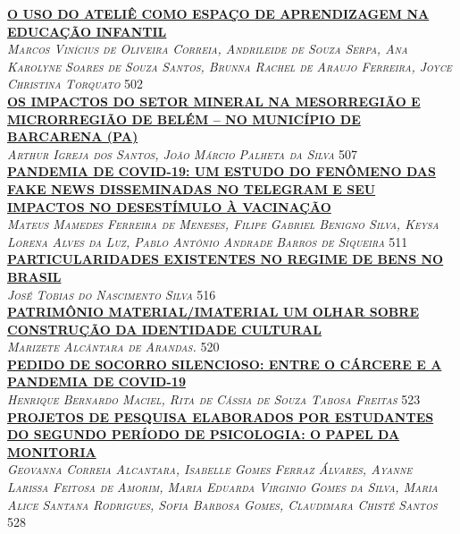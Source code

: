 \noindent \textsc{\hyperlink{trabalhos/251723.pdf.1}{\textbf{O USO DO ATELIÊ COMO ESPAÇO DE APRENDIZAGEM NA EDUCAÇÃO INFANTIL}}}\\ 
\noindent \textsc{\textit{Marcos Vinícius de Oliveira Correia, Andrileide de Souza Serpa, Ana Karolyne Soares de Souza Santos, Brunna Rachel de Araujo Ferreira, Joyce Christina Torquato}} \hfill 502\\ 

\noindent \textsc{\hyperlink{trabalhos/247992.pdf.1}{\textbf{OS IMPACTOS DO SETOR MINERAL NA MESORREGIÃO E MICRORREGIÃO DE BELÉM – NO MUNICÍPIO DE BARCARENA (PA)  }}}\\ 
\noindent \textsc{\textit{Arthur Igreja dos Santos, João Márcio Palheta da Silva}} \hfill 507\\ 

\noindent \textsc{\hyperlink{trabalhos/250093.pdf.1}{\textbf{PANDEMIA DE COVID-19: UM ESTUDO DO FENÔMENO DAS FAKE NEWS DISSEMINADAS NO TELEGRAM E SEU IMPACTOS NO DESESTÍMULO À VACINAÇÃO}}}\\ 
\noindent \textsc{\textit{Mateus Mamedes Ferreira de Meneses, Filipe Gabriel Benigno Silva, Keysa Lorena Alves da Luz, Pablo Antônio Andrade Barros de Siqueira}} \hfill 511\\ 

\noindent \textsc{\hyperlink{trabalhos/242542.pdf.1}{\textbf{PARTICULARIDADES EXISTENTES NO REGIME DE BENS NO BRASIL}}}\\ 
\noindent \textsc{\textit{José Tobias do Nascimento Silva}} \hfill 516\\ 

\noindent \textsc{\hyperlink{trabalhos/250219.pdf.1}{\textbf{PATRIMÔNIO MATERIAL/IMATERIAL UM OLHAR SOBRE CONSTRUÇÃO DA IDENTIDADE CULTURAL}}}\\ 
\noindent \textsc{\textit{Marizete Alcântara de Arandas.}} \hfill 520\\ 

\noindent \textsc{\hyperlink{trabalhos/250281.pdf.1}{\textbf{PEDIDO DE SOCORRO SILENCIOSO: ENTRE O CÁRCERE E A PANDEMIA DE COVID-19}}}\\ 
\noindent \textsc{\textit{Henrique Bernardo Maciel, Rita de Cássia de Souza Tabosa Freitas}} \hfill 523\\ 

\noindent \textsc{\hyperlink{trabalhos/251047.pdf.1}{\textbf{PROJETOS DE PESQUISA ELABORADOS POR ESTUDANTES DO SEGUNDO PERÍODO DE PSICOLOGIA: O PAPEL DA MONITORIA}}}\\ 
\noindent \textsc{\textit{Geovanna Correia Alcantara, Isabelle Gomes Ferraz Álvares, Ayanne Larissa Feitosa de Amorim, Maria Eduarda Virginio Gomes da Silva, Maria Alice Santana Rodrigues, Sofia Barbosa Gomes, Claudimara Chisté Santos}} \hfill 528\\ 

